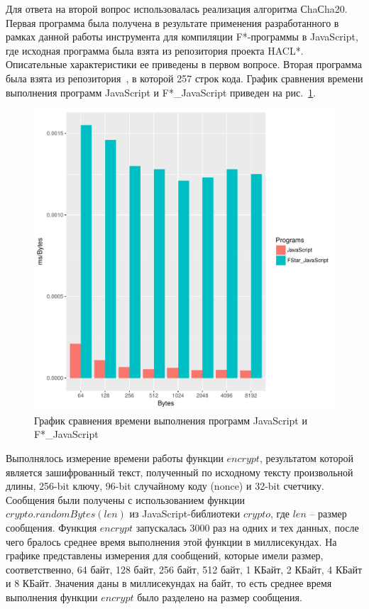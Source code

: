 \documentclass[12pt]{matmex-diploma}
\begin{document}
Для ответа на второй вопрос использовалась реализация алгоритма СhaСha20. Первая программа была получена в результате применения разработанного в рамках данной работы инструмента для компиляции F*-программы в JavaScript, где исходная программа была взята из репозитория проекта HACL*. Описательные характеристики ее приведены в первом вопросе. Вторая программа была взята из репозитория~\cite{chachajs}, в которой 257 строк кода. График сравнения времени выполнения программ JavaScript и F*\_JavaScript приведен на рис.~\ref{fig:comparison}.

\begin{figure}[h!]
\begin{center}
\includegraphics[width=.9\textwidth]{Comparison}
\caption{График сравнения времени выполнения программ JavaScript и F*\_JavaScript}
\label{fig:comparison} 
\end{center}
\end{figure}

Выполнялось измерение времени работы функции $encrypt$, результатом которой является зашифрованный текст, полученный по исходному тексту произвольной длины, 256-bit ключу, 96-bit случайному коду (nonce) и 32-bit счетчику. Сообщения были получены с использованием функции $crypto.randomBytes(len)$ из JavaScript-библиотеки $crypto$, где $len$ -- размер сообщения. Функция $encrypt$ запускалась 3000 раз на одних и тех данных, после чего бралось среднее время выполнения этой функции в миллисекундах. На графике представлены измерения для сообщений, которые имели размер, соответственно, 64 байт, 128 байт, 256 байт, 512 байт, 1 КБайт, 2 КБайт, 4 КБайт и 8 КБайт. Значения даны в миллисекундах на байт, то есть среднее время выполнения функции $encrypt$ было разделено на размер сообщения.
\end{document}
